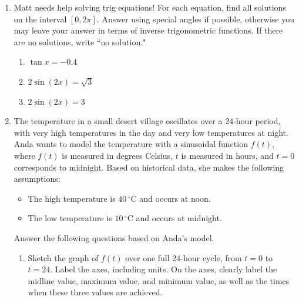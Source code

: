 \documentclass{article}
\begin{document}
\begin{enumerate}


\pspace{\newpage}

\item Matt needs help solving trig equations! For each equation, find all solutions on the interval $[0, 2\pi]$. Answer using special angles if possible, otherwise you may leave your answer in terms of inverse trigonometric functions. If there are no solutions, write ``no solution."

\begin{enumerate}[topsep=0pt]
    \item $\tan x =-0.4$
    \pspace{\vfill}

    \item $2\sin(2x)=\sqrt{3}$
    \pspace{\vfill}
    
    \item $2\sin(2x)=3$
    \pspace{\vfill}

\end{enumerate}

\pspace{\newpage}

\item The temperature in a small desert village oscillates over a 24-hour period, with very high temperatures in the day and very low temperatures at night. Anda wants to model the temperature with a sinusoidal function $f(t)$, where $f(t)$ is measured in degrees Celsius, $t$ is measured in hours, and $t=0$ corresponds to midnight. Based on historical data, she makes the following assumptions: 
\begin{itemize}[nosep]
    \item The high temperature is $40\,^\circ$C and occurs at noon.
    \item The low temperature is $10\,^\circ$C and occurs at midnight.
\end{itemize} 
Answer the following questions based on Anda's model. 

\begin{enumerate}[topsep=0pt]
    \item Sketch the graph of $f(t)$ over one full 24-hour cycle, from $t=0$ to $t=24$. Label the axes, including units. On the axes, clearly label the midline value, maximum value, and minimum value, as well as the times when these three values are achieved.
    

\end{enumerate}
\end{enumerate}
\end{document}
